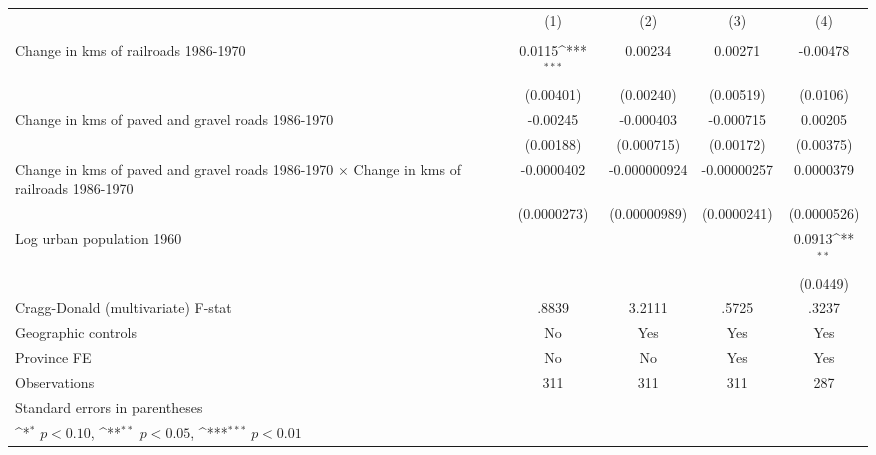 {
\def\sym#1{\ifmmode^{#1}\else\(^{#1}\)\fi}
\begin{tabular}{l*{4}{c}}
\hline\hline
                &\multicolumn{1}{c}{(1)}&\multicolumn{1}{c}{(2)}&\multicolumn{1}{c}{(3)}&\multicolumn{1}{c}{(4)}\\
                &\multicolumn{1}{c}{}&\multicolumn{1}{c}{}&\multicolumn{1}{c}{}&\multicolumn{1}{c}{}\\
\hline
Change in kms of railroads 1986-1970&   0.0115\sym{***}&  0.00234         &  0.00271         & -0.00478         \\
                &(0.00401)         &(0.00240)         &(0.00519)         & (0.0106)         \\
[1em]
Change in kms of paved and gravel roads 1986-1970& -0.00245         &-0.000403         &-0.000715         &  0.00205         \\
                &(0.00188)         &(0.000715)         &(0.00172)         &(0.00375)         \\
[1em]
Change in kms of paved and gravel roads 1986-1970 $\times$ Change in kms of railroads 1986-1970&-0.0000402         &-0.000000924         &-0.00000257         &0.0000379         \\
                &(0.0000273)         &(0.00000989)         &(0.0000241)         &(0.0000526)         \\
[1em]
Log urban population 1960&                  &                  &                  &   0.0913\sym{**} \\
                &                  &                  &                  & (0.0449)         \\
\hline
Cragg-Donald (multivariate) F-stat&    .8839         &   3.2111         &    .5725         &    .3237         \\
Geographic controls&       No         &      Yes         &      Yes         &      Yes         \\
Province FE     &       No         &       No         &      Yes         &      Yes         \\
Observations    &      311         &      311         &      311         &      287         \\
\hline\hline
\multicolumn{5}{l}{\footnotesize Standard errors in parentheses}\\
\multicolumn{5}{l}{\footnotesize \sym{*} \(p<0.10\), \sym{**} \(p<0.05\), \sym{***} \(p<0.01\)}\\
\end{tabular}
}
